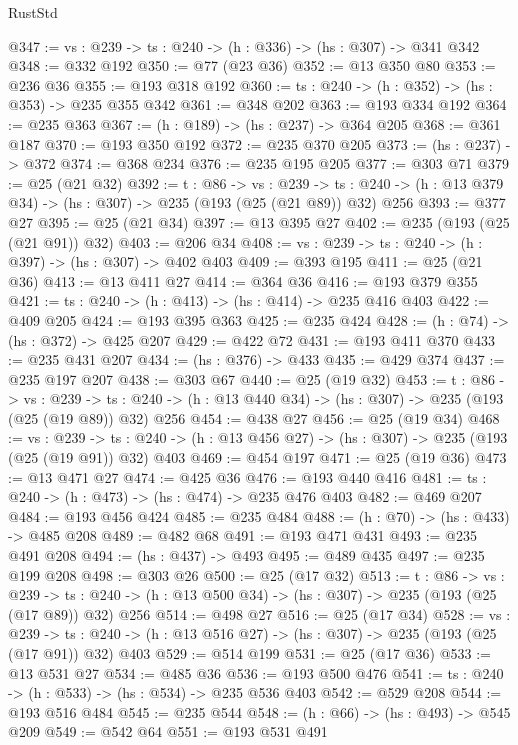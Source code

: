 \begin{lexlean}{RustStd}
\begin{coremodule}
@347 := {vs : @239} -> {ts : @240} -> (h : @336) -> (hs : @307) -> @341 @342
@348 := @332 @192
@350 := @77 (@23 @36)
@352 := @13 @350 @80
@353 := @236 @36
@355 := @193 @318 @192
@360 := {ts : @240} -> (h : @352) -> (hs : @353) -> @235 @355 @342
@361 := @348 @202
@363 := @193 @334 @192
@364 := @235 @363
@367 := (h : @189) -> (hs : @237) -> @364 @205
@368 := @361 @187
@370 := @193 @350 @192
@372 := @235 @370 @205
@373 := (hs : @237) -> @372
@374 := @368 @234
@376 := @235 @195 @205
@377 := @303 @71
@379 := @25 (@21 @32)
@392 := {t : @86} ->
  {vs : @239} ->
  {ts : @240} -> (h : @13 @379 @34) -> (hs : @307) -> @235 (@193 (@25 (@21 @89)) @32) @256
@393 := @377 @27
@395 := @25 (@21 @34)
@397 := @13 @395 @27
@402 := @235 (@193 (@25 (@21 @91)) @32)
@403 := @206 @34
@408 := {vs : @239} -> {ts : @240} -> (h : @397) -> (hs : @307) -> @402 @403
@409 := @393 @195
@411 := @25 (@21 @36)
@413 := @13 @411 @27
@414 := @364 @36
@416 := @193 @379 @355
@421 := {ts : @240} -> (h : @413) -> (hs : @414) -> @235 @416 @403
@422 := @409 @205
@424 := @193 @395 @363
@425 := @235 @424
@428 := (h : @74) -> (hs : @372) -> @425 @207
@429 := @422 @72
@431 := @193 @411 @370
@433 := @235 @431 @207
@434 := (hs : @376) -> @433
@435 := @429 @374
@437 := @235 @197 @207
@438 := @303 @67
@440 := @25 (@19 @32)
@453 := {t : @86} ->
  {vs : @239} ->
  {ts : @240} -> (h : @13 @440 @34) -> (hs : @307) -> @235 (@193 (@25 (@19 @89)) @32) @256
@454 := @438 @27
@456 := @25 (@19 @34)
@468 := {vs : @239} ->
  {ts : @240} -> (h : @13 @456 @27) -> (hs : @307) -> @235 (@193 (@25 (@19 @91)) @32) @403
@469 := @454 @197
@471 := @25 (@19 @36)
@473 := @13 @471 @27
@474 := @425 @36
@476 := @193 @440 @416
@481 := {ts : @240} -> (h : @473) -> (hs : @474) -> @235 @476 @403
@482 := @469 @207
@484 := @193 @456 @424
@485 := @235 @484
@488 := (h : @70) -> (hs : @433) -> @485 @208
@489 := @482 @68
@491 := @193 @471 @431
@493 := @235 @491 @208
@494 := (hs : @437) -> @493
@495 := @489 @435
@497 := @235 @199 @208
@498 := @303 @26
@500 := @25 (@17 @32)
@513 := {t : @86} ->
  {vs : @239} ->
  {ts : @240} -> (h : @13 @500 @34) -> (hs : @307) -> @235 (@193 (@25 (@17 @89)) @32) @256
@514 := @498 @27
@516 := @25 (@17 @34)
@528 := {vs : @239} ->
  {ts : @240} -> (h : @13 @516 @27) -> (hs : @307) -> @235 (@193 (@25 (@17 @91)) @32) @403
@529 := @514 @199
@531 := @25 (@17 @36)
@533 := @13 @531 @27
@534 := @485 @36
@536 := @193 @500 @476
@541 := {ts : @240} -> (h : @533) -> (hs : @534) -> @235 @536 @403
@542 := @529 @208
@544 := @193 @516 @484
@545 := @235 @544
@548 := (h : @66) -> (hs : @493) -> @545 @209
@549 := @542 @64
@551 := @193 @531 @491

\end{coremodule}
\end{lexlean}
